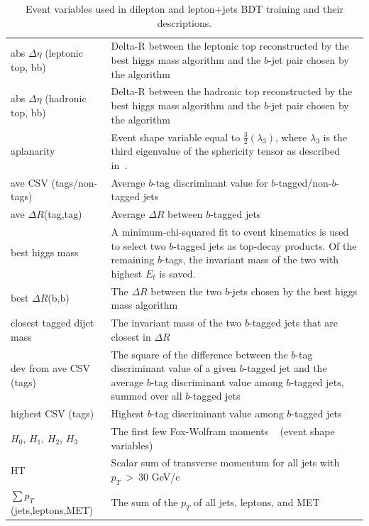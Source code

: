 \begin{table}[hbtp]\footnotesize
 \centering 
 \caption{Event variables used in dilepton and lepton+jets BDT training and their descriptions.}
 \label{tab:bdt_input_vars}
 \begin{tabular}{| l | p{10cm} |}
   \hline
   abs \(\Delta \eta\) (leptonic top, bb)      					&  Delta-R between the leptonic top reconstructed by the best higgs mass algorithm and the $b$-jet pair chosen by the algorithm \\
   abs \(\Delta \eta\) (hadronic top, bb)						&  Delta-R between the hadronic top reconstructed by the best higgs mass algorithm and the $b$-jet pair chosen by the algorithm \\
   aplanarity  									&  Event shape variable equal to \(\frac{3}{2}(\lambda_{3})\), where \(\lambda_{3}\) is the third eigenvalue of the sphericity tensor as described in~\cite{PhysRevD.1.1416}. \\
   ave CSV (tags/non-tags)    							&  Average $b$-tag discriminant value for $b$-tagged/non-$b$-tagged jets \\
   ave \(\Delta R\)(tag,tag)  							&  Average \(\Delta R\) between $b$-tagged jets \\
   best higgs mass   								&  A minimum-chi-squared fit to event kinematics is used to select two $b$-tagged jets as top-decay products. Of the remaining $b$-tags, the invariant mass of the two with highest $E_{t}$ is saved. \\
   best \(\Delta R\)(b,b)								& The \(\Delta R\) between the two $b$-jets chosen by the best higgs mass algorithm \\
   closest tagged dijet mass  							&  The invariant mass of the two $b$-tagged jets that are closest in \(\Delta R\)  \\
   dev from ave CSV (tags)  							&  The square of the difference between the $b$-tag discriminant value of a given $b$-tagged jet and the average $b$-tag discriminant value among $b$-tagged jets, summed over all $b$-tagged jets \\
   highest CSV (tags)  								&  Highest $b$-tag discriminant value among $b$-tagged jets \\
   $H_{0}$, $H_{1}$, $H_{2}$, $H_{3}$  						&  The first few Fox-Wolfram moments ~\cite{tagkey1979543} (event shape variables)  \\
   HT										& Scalar sum of transverse momentum for all jets with \(p_{T}~>~30\) GeV/c \\
\(\sum p_{T}\)(jets,leptons,MET)  						&  The sum of the \(p_{T}\) of all jets, leptons, and MET \\

\end{tabular}
\end{table}
